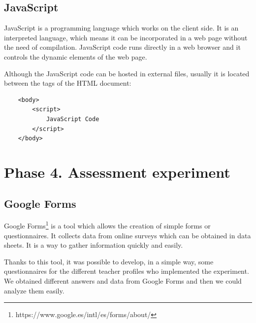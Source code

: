 \subsection{JavaScript}
\label{subsec:javascript}

JavaScript is a programming language which works on the client side. It is an interpreted language, which means it can be incorporated in a web page without the need of compilation. JavaScript code runs directly in a web browser and it controls the dynamic elements of the web page. 

Although the JavaScript code can be hosted in external files, usually it is located between the tags of the HTML document:

{\footnotesize
\begin{verbatim}
    <body>
        <script>
            JavaScript Code
        </script>        
    </body>
\end{verbatim}
}



\section{Phase 4. Assessment experiment}
\label{sec:phase_4}

\subsection{Google Forms}
\label{subsec:google_forms}

Google Forms\footnote{https://www.google.es/intl/es/forms/about/} is a tool which allows the creation of simple forms or questionnaires. It collects data from online surveys which can be obtained in data sheets. It is a way to gather information quickly and easily.

Thanks to this tool, it was possible to develop, in a simple way, some questionnaires for the different teacher profiles who implemented the experiment. We obtained different answers and data from Google Forms and then we could analyze them easily.


